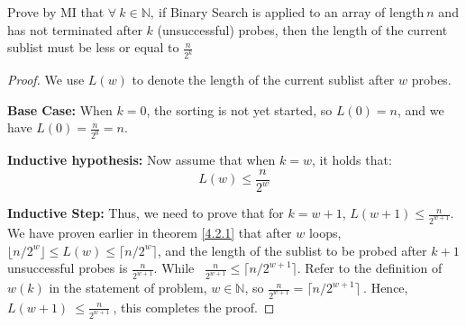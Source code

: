     \begin{exercise}
        Prove by MI that $\displaystyle \forall \ k\in \mathbb{N} ,\ $if Binary Search is applied to an array of length$\displaystyle \ n$ and has not terminated after $\displaystyle k$ (unsuccessful) probes, then the length of the current sublist must be less or equal to $\displaystyle \frac{n}{2^{k}}$
    \end{exercise}
    \begin{proof}
        We use $\displaystyle L(w)$ to denote the length of the current sublist after $\displaystyle w$ probes.
        
        \textbf{Base Case:}
        When $\displaystyle k=0$, the sorting is not yet started, so $\displaystyle L( 0) =n$, and we have $\displaystyle L( 0) =\frac{n}{2^{0}} =n$.
        
        \textbf{Inductive hypothesis:}
        Now assume that when $\displaystyle k=w$, it holds that:
        \begin{equation*}
        L( w) \leq \frac{n}{2^{w}}
        \end{equation*}
        
        \textbf{Inductive Step:}
        Thus, we need to prove that for $\displaystyle k=w+1$, $\displaystyle L( w+1) \leq 
        \frac{n}{2^{w+1}}$.
        We have proven earlier in theorem \ref{4.2.1} that after $\displaystyle w$ loops, $\displaystyle 
        \lfloor n/2^{w} \rfloor \leq L( w) \leq \lceil n/2^{w} \rceil $, and the length of the 
        sublist to be probed after $\displaystyle k+1$ unsuccessful probes is $\displaystyle 
        \frac{n}{2^{w+1}}$. While \ $\displaystyle \frac{n}{2^{w+1}} \leq \lceil n/2^{w+1} \rceil $. 
        Refer to the definition of $\displaystyle w( k)$ in the statement of problem, $\displaystyle 
        w\in \mathbb{N}$, so $\displaystyle \frac{n}{2^{w+1}} =\lceil n/2^{w+1} \rceil \ $. Hence, $\displaystyle L( w+1) \ \leq \frac{n}{2^{w+1}} \ $, this completes the proof.
    \end{proof}
    


